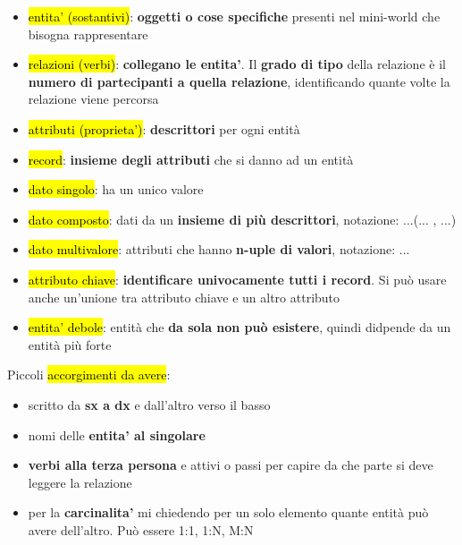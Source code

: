 \begin{itemize}
	\item \hl{entita' (sostantivi)}: \textbf{oggetti o cose specifiche} presenti nel mini-world che bisogna rappresentare

	\item \hl{relazioni (verbi)}: \textbf{collegano le entita'}. Il \textbf{grado di tipo} della relazione è il \textbf{numero di partecipanti a quella relazione}, identificando quante volte la relazione viene percorsa
	
	\item \hl{attributi (proprieta')}: \textbf{descrittori} per ogni entità
	
	\item \hl{record}: \textbf{insieme degli attributi} che si danno ad un entità
	
	\item \hl{dato singolo}: ha un unico valore
	
	\item \hl{dato composto}: dati da un \textbf{insieme di più descrittori}, notazione: ...(... , ...)
	
	\item \hl{dato multivalore}: attributi che hanno \textbf{n-uple di valori}, notazione: {...}
	
	\item \hl{attributo chiave}: \textbf{identificare univocamente tutti i record}. Si può usare anche un'unione tra attributo chiave e un altro attributo
	
	\item \hl{entita' debole}: entità che \textbf{da sola non può esistere}, quindi didpende da un entità più forte
	
\end{itemize}

Piccoli \hl{accorgimenti da avere}:

\begin{itemize}
	\item scritto da \textbf{sx a dx} e dall'altro verso il basso
	
	\item nomi delle \textbf{entita' al singolare}
	
	\item \textbf{verbi alla terza persona} e attivi o passi per capire da che parte si deve leggere la relazione
	
	\item per la \textbf{carcinalita'} mi chiedendo per un solo elemento  quante entità può avere dell'altro. Può essere 1:1, 1:N, M:N
\end{itemize}
